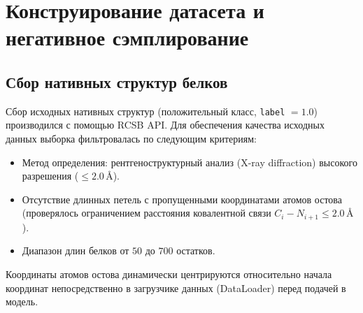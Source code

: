 \documentclass[12pt, a4paper]{article}
\begin{document}
\newpage

\section{Конструирование датасета и негативное сэмплирование}

\subsection{Сбор нативных структур белков}
Сбор исходных нативных структур (положительный класс, \texttt{label} $= 1.0$) производился с помощью RCSB API. Для обеспечения качества исходных данных выборка фильтровалась по следующим критериям:
\begin{itemize}
    \item Метод определения: рентгеноструктурный анализ (X-ray diffraction) высокого разрешения ($\le 2.0\,\text{\AA}$).
    \item Отсутствие длинных петель с пропущенными координатами атомов остова (проверялось ограничением расстояния ковалентной связи $C_i - N_{i+1} \le 2.0\,\text{\AA}$).
    \item Диапазон длин белков от $50$ до $700$ остатков.
\end{itemize}
Координаты атомов остова динамически центрируются относительно начала координат непосредственно в загрузчике данных (DataLoader) перед подачей в модель.
\end{document}
